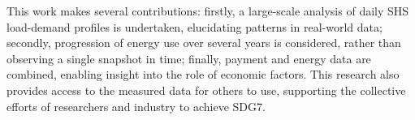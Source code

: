 This work makes several contributions: firstly, a large-scale analysis of daily SHS load-demand profiles is undertaken, elucidating patterns in real-world data; secondly, progression of energy use over several years is considered, rather than observing a single snapshot in time; finally, payment and energy data are combined, enabling insight into the role of economic factors. This research also provides access to the measured data for others to use, supporting the collective efforts of researchers and industry to achieve SDG7.